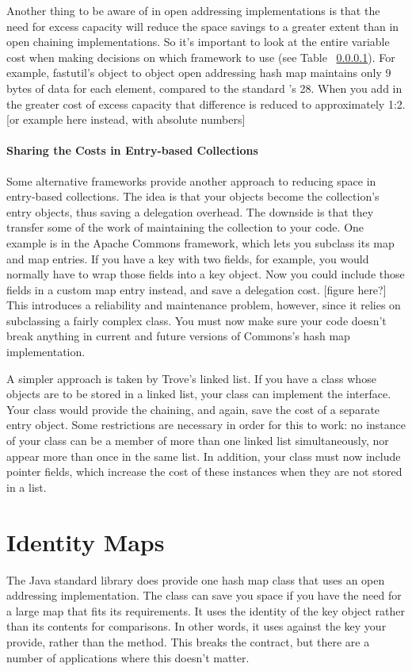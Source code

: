 Another thing to be aware of in open addressing implementations is that the
need for excess capacity will reduce the space savings to a greater
extent than in open chaining implementations. So it's important to look at the
entire variable cost when making decisions on which framework to use (see Table
~\ref{}).  For example, fastutil's object to object open addressing
hash map maintains only 9 bytes of data for each element, compared to the standard
's 28. When you add in the greater cost of excess capacity that
difference is reduced to approximately 1:2. [or example here instead, with
absolute numbers]

\paragraph{Sharing the Costs in Entry-based Collections}
Some alternative frameworks provide another approach to reducing space in
entry-based collections. The idea is that your objects become
the collection's entry objects, thus saving a delegation overhead. The downside
is that they transfer some of the work of maintaining the collection to your code.
One example is in the Apache Commons framework, which lets you subclass its map
and map entries. If you have a key with two fields, for example, you would
normally have to wrap those fields into a key object. Now 
you could include those fields in a custom map entry instead, and save a
delegation cost. [figure here?]  This introduces a reliability and maintenance
problem, however, since it relies on subclassing a fairly complex class. You must now make sure
your code doesn't break anything in current and future versions of Commons's
hash map implementation.

A simpler approach is taken by Trove's linked list. If you have a class whose
objects are to be stored in a linked list, your class can implement the
 interface. Your class would provide the chaining, and
again, save the cost of a separate entry object.  Some restrictions are
necessary in order for this to work: no instance of your class can
be a member of more than one linked list simultaneously, nor appear more than
once in the same list. In addition, your class must now include
pointer fields, which increase the cost of these instances when they are
not stored in a list.

\section{Identity Maps}
\label{sec:identity-maps}
The Java standard library does provide one hash map class that uses an open
addressing implementation. The  class can save you space
if you have the need for a large map that fits its requirements.  
It uses the identity of the key object 
rather than its contents for comparisons. In
other words, it uses \code{==} against the key your provide, rather than the
 method. This breaks the  contract, but there are a
number of applications where this doesn't matter.

